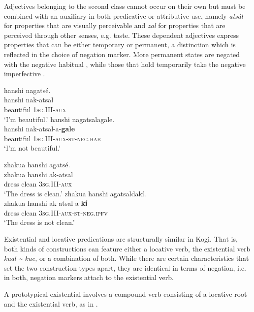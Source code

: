 \documentclass[output=paper,colorlinks,citecolor=brown]{langscibook}
\begin{document}
Adjectives belonging to the second class cannot occur on their own but must be combined with an auxiliary in both predicative or attributive use, namely \textit{ats\'{a}l} for properties that are visually perceivable and \textit{zal} for properties that are perceived through other senses, e.g. taste. These dependent adjectives express properties that can be either temporary or permanent, a distinction which is reflected in the choice of negation marker. More permanent states are negated with the negative habitual , while those that hold temporarily take the negative imperfective .

\newpage
\ea\label{ex:kog:37}
    \ea\label{ex:kog:37a}hanshi nagatsé.\\
        \gll  hanshi nak{}-atsal\\ 
               beautiful \textsc{1sg.III{}-aux}\\
        \glt ‘I'm beautiful.’
    \ex\label{ex:kog:37b}hanshi nagatsalagale.\\
        \gll  hanshi nak{}-atsal{}-a-\textbf{gale}\\
              beautiful \textsc{1sg.III{}-aux{}-st}{}-\textsc{neg.hab}\\
        \glt ‘I'm not beautiful.’
    \z
\z 

\ea\label{ex:kog:38}
    \ea\label{ex:kog:38a}zhakua hanshi agatsé.\\
        \gll  zhakua hanshi ak-atsal\\ 
              dress clean \textsc{3sg.III{}-aux}\\
        \glt ‘The dress is clean.’
    \ex\label{ex:kog:38b}zhakua hanshi agatsaldakí.\\
        \gll  zhakua hanshi ak-atsal-a-\textbf{kí}\\
              dress clean \textsc{3sg.III{}-aux-st-neg.ipfv}\\
        \glt  ‘The dress is not clean.’
    \z
\z 

Existential and locative predications are structurally similar in Kogi. That is, both kinds of constructions can feature either a locative verb, the existential verb \textit{kual {\textasciitilde} kue,} or a combination of both. While there are certain characteristics that set the two construction types apart, they are identical in terms of negation, i.e. in both, negation markers attach to the existential verb.

A prototypical existential involves a compound verb consisting of a locative root and the existential verb, as in .
\end{document}
